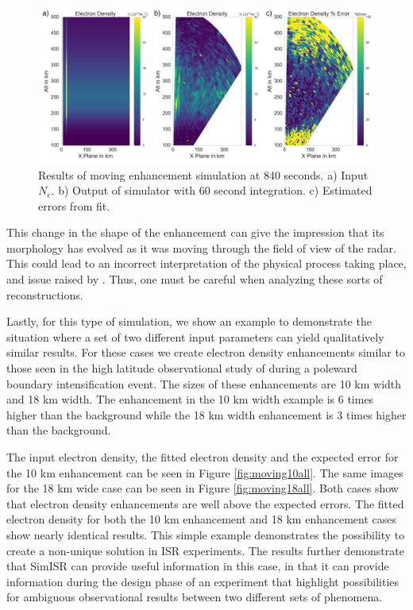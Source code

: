 \begin{figure}[!t]
\centering
\includegraphics[width=6in]{moving14mins}
\caption{Results of moving enhancement simulation at 840 seconds. a) Input $N_e$. b) Output of simulator with 60 second integration. c) Estimated errors from fit.}
\label{fig:moving14mins}
\end{figure}

This change in the shape of the enhancement can give the impression that its morphology has evolved as it was moving through the field of view of the radar. This could lead to an incorrect interpretation of the physical process taking place, and issue raised by \cite{Dahlgren:2012dq}.   Thus, one must be careful when analyzing these sorts of reconstructions.

Lastly, for this type of simulation, we show an example to demonstrate the situation where a set of two different input parameters can yield qualitatively similar results. For these cases we create electron density enhancements similar to those seen in the high latitude observational study of \cite{Semeter:2005fo} during a poleward boundary intensification event. The sizes of these enhancements are 10 km width and 18 km width. The enhancement in the 10 km width example is 6 times higher than the background while the 18 km width enhancement is 3 times higher than the background.

The input electron density, the fitted electron density and the expected error for the 10 km enhancement can be seen in Figure \ref{fig:moving10all}. The same images for the 18 km wide case can be seen in Figure \ref{fig:moving18all}. Both cases show that electron density enhancements are well above the expected errors.
The fitted electron density for both the 10 km enhancement and 18 km enhancement cases show nearly identical results. This simple example demonstrates the possibility to create a non-unique solution in ISR experiments. The results further demonstrate that SimISR can provide useful information in this case, in that it can provide information during the design phase of an experiment that highlight possibilities for ambiguous observational results between two different sets of phenomena. 

